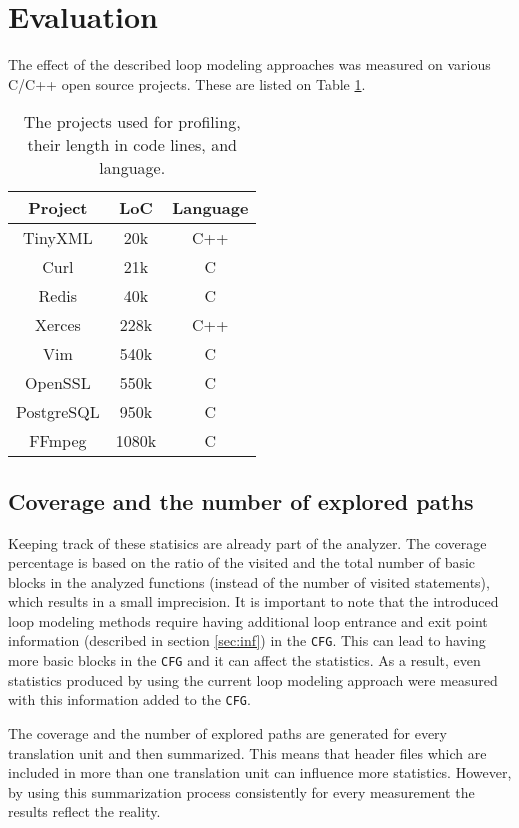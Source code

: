 
\section{Evaluation}

The effect of the described loop modeling approaches was measured on various 
C/C++ open source projects. These are listed on Table \ref{tab:lines}.

\begin{table}[!htb]
	\centering
\begin{tabular}{ |c||c|c| }
	\hline
	Project & LoC & Language \\
	\hline
	TinyXML & 20k & C++ \\
	\hline
	Curl & 21k & C  \\ 
	\hline
	Redis & 40k & C \\ 
	\hline
	Xerces & 228k & C++ \\ 
	\hline
	Vim & 540k & C \\ 
	\hline
	OpenSSL & 550k & C  \\ 
	\hline
	PostgreSQL & 950k & C \\ 
	\hline
	FFmpeg & 1080k & C \\	
	\hline
\end{tabular}
\caption{The projects used for profiling, their length in code lines, and 
language.}\label{tab:lines}
\end{table}

\subsection{Coverage and the number of explored paths}
Keeping track of these statisics are already part of the analyzer. The 
coverage percentage is based on the ratio of the visited and the total number 
of basic blocks in the analyzed functions (instead of the number of visited statements),
which results in a small imprecision. 
It is important to note that the introduced loop modeling methods require having 
additional loop entrance and exit point information (described in section 
\ref{sec:inf}) in the \texttt{CFG}. This can lead to having more 
basic blocks in the \texttt{CFG} and it can affect the statistics. As a result, 
even statistics produced by using the current loop modeling 
approach were measured with this information added to the \texttt{CFG}.

The coverage and the number of explored paths are generated for every 
translation unit and then summarized. This means that header files which 
are included in more than one translation unit can influence more statistics.
However, by using this summarization process consistently for every measurement 
the results reflect the reality. 

